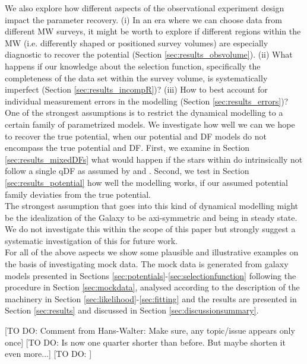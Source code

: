 We also explore how different aspects of the observational experiment design impact the parameter recovery. (i) In an era where we can choose data from different MW surveys, it might be worth to explore if different regions within the MW (i.e. differently shaped or positioned survey volumes) are especially diagnostic to recover the potential (Section \ref{sec:results_obsvolume}). (ii) What happens if our knowledge about the selection function, specifically the completeness of the data set within the survey volume, is systematically imperfect (Section \ref{sec:results_incompR})? (iii) How to best account for individual measurement errors in the modelling (Section \ref{sec:results_errors})? \\

One of the strongest assumptions is to restrict the dynamical modelling to a certain family of parametrized models. We investigate how well we can we hope to recover the true potential, when our potential and DF models do not encompass the true potential and DF. First, we examine in Section \ref{sec:results_mixedDFs} what would happen if the stars within \MAPs{} do intrinsically not follow a single qDF as assumed by \citet{tin13} and \citet{bov13}. Second, we test in Section \ref{sec:results_potential} how well the modelling works, if our assumed potential family deviaties from the true potential.\\

The strongest assumption that goes into this kind of dynamical modelling might be the idealization of the Galaxy to be axi-symmetric and being in steady state. We do not investigate this within the scope of this paper but strongly suggest a systematic investigation of this for future work.\\

For all of the above aspects we show some plausible and illustrative examples on the basis of investigating mock data. The mock data is generated from galaxy models presented in Sections \ref{sec:potentials}-\ref{sec:selectionfunction} following the procedure in Section \ref{sec:mockdata}, analysed according to the description of the machinery in Section \ref{sec:likelihood}-\ref{sec:fitting} and the results are presented in Section \ref{sec:results} and discussed in Section \ref{sec:discussionsummary}.

[TO DO: Comment from Hans-Walter: Make sure, any topic/issue appears only once]
[TO DO: Is now one quarter shorter than before. But maybe shorten it even more...]
[TO DO: ]